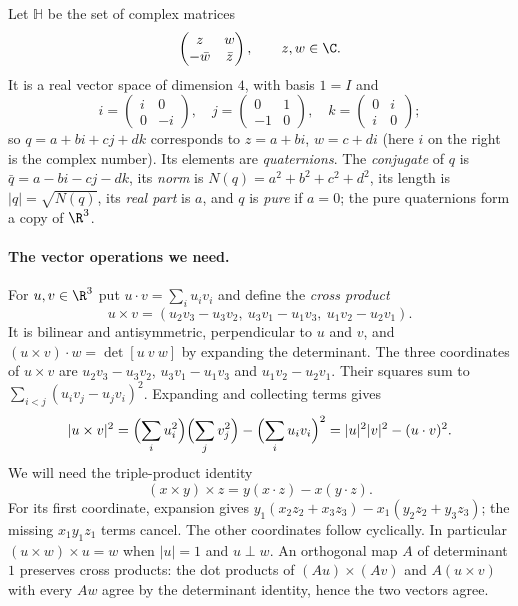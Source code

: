 \begin{definition}
Let $\mathbb H$ be the set of complex matrices
\[
\begin{pmatrix}z&w\\-\bar w&\bar z\end{pmatrix},\qquad z,w\in\C.
\]
It is a real vector space of dimension $4$, with basis $1=I$ and
\[
i=\begin{pmatrix}i&0\\0&-i\end{pmatrix},\quad j=\begin{pmatrix}0&1\\-1&0\end{pmatrix},\quad k=\begin{pmatrix}0&i\\i&0\end{pmatrix};
\]
so $q=a+bi+cj+dk$ corresponds to $z=a+bi$, $w=c+di$ (here $i$ on the right is the complex number). Its elements are \emph{quaternions}. The \emph{conjugate} of $q$ is $\bar q=a-bi-cj-dk$, its \emph{norm} is $N(q)=a^2+b^2+c^2+d^2$, its length is $|q|=\sqrt{N(q)}$, its \emph{real part} is $a$, and $q$ is \emph{pure} if $a=0$; the pure quaternions form a copy of $\R^3$.
\end{definition}

\paragraph{The vector operations we need.}
For $u,v\in\R^3$ put $u\cdot v=\sum_i u_iv_i$ and define the
\emph{cross product}
\[
u\times v=(u_2v_3-u_3v_2,\ u_3v_1-u_1v_3,\ u_1v_2-u_2v_1).
\]
It is bilinear and antisymmetric, perpendicular to $u$ and $v$, and
$(u\times v)\cdot w=\det[u\ v\ w]$ by expanding the determinant.
The three coordinates of $u\times v$ are $u_2v_3-u_3v_2$, $u_3v_1-u_1v_3$ and $u_1v_2-u_2v_1$. Their squares sum to $\sum_{i<j}(u_iv_j-u_jv_i)^2$. Expanding and collecting terms gives
\[
|u\times v|^2=\Bigl(\sum_iu_i^2\Bigr)\Bigl(\sum_jv_j^2\Bigr)-\Bigl(\sum_iu_iv_i\Bigr)^2=|u|^2|v|^2-(u\cdot v)^2.
\]
We will need the triple-product identity
\[
(x\times y)\times z=y(x\cdot z)-x(y\cdot z).
\]
For its first coordinate, expansion gives
$y_1(x_2z_2+x_3z_3)-x_1(y_2z_2+y_3z_3)$; the missing
$x_1y_1z_1$ terms cancel. The other coordinates follow cyclically.
In particular $(u\times w)\times u=w$ when $|u|=1$ and $u\perp w$.
An orthogonal map $A$ of determinant $1$ preserves cross products:
the dot products of $(Au)\times(Av)$ and $A(u\times v)$ with every $Aw$
agree by the determinant identity, hence the two vectors agree.

